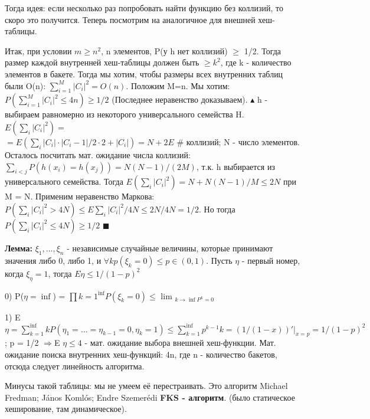 Тогда идея: если несколько раз попробовать найти функцию без коллизий, то скоро это получится. Теперь посмотрим на аналогичное для внешней хеш-таблицы. \par
Итак, при условии $m \geqslant n^2$, n элементов, P(у h нет коллизий) $\geqslant$ 1/2. Тогда размер каждой внутренней хеш-таблицы должен быть $\geqslant k^2$, где k - количество элементов в бакете. Тогда мы хотим, чтобы размеры всех внутренних таблиц были {O}(n): $\sum_{i=1}^M |C_i|^2 = {O}(n)$. Положим M=n. Мы хотим: $P(\sum_{i=1}^M |C_i|^2 \leqslant 4n) \geqslant 1/2$ (Последнее неравенство доказываем). 
$\blacktriangle$
h - выбираем равномерно из некоторого универсального семейства H. $E(\sum_i |C_i|^2) = $ \\
$= E(\sum_i |C_i|\cdot |C_i -1| /2 \cdot 2 + |C_i|) = N + 2E$ \# коллизий; N - число элементов. Осталось посчитать мат. ожидание числа коллизий: $\sum_{i < j} P(h(x_i) = h(x_j)) = N(N-1)/(2M)$, т.к. h выбирается из универсального семейства. Тогда $E(\sum_i |C_i|^2) = N + N(N-1)/M \leqslant 2N$ при M = N. Применим неравенство Маркова: $P(\sum_i |C_i|^2 > 4N) \leqslant E \sum_i |C_i|^2 /4N \leqslant 2N/4N = 1/2$. Но тогда $P(\sum_i |C_i|^2 \leqslant 4N) \geqslant 1/2$
$\blacksquare$ \par
\textbf{Лемма:} $\xi_1, \dots, \xi_n$ - независимые случайные величины, которые принимают значения либо 0, либо 1, и $\forall k p(\xi_k = 0) \leqslant p \in (0, 1)$. Пусть $\eta$ - первый номер, когда $\xi_{\eta} = 1$, тогда $E \eta \leqslant 1/(1-p)^2$ \par
0) P($\eta = \inf$) = $\prod{k=1}^{\inf} P(\xi_k = 0) \leqslant$ lim $_{k \rightarrow \inf P^k = 0}$ \par
1) E $\eta = \sum_{k=1}^{\inf} k P(\eta_1 = \dots = \eta_{k-1} = 0, \eta_k = 1) \leqslant \sum_{k=1}^{\inf} p^{k-1}k = (1/(1-x))'|_{x=p} = 1/(1-p)^2$; p = 1/2 $\Rightarrow $E $\eta \leqslant 4$ - мат. ожидание выбора внешней хеш-функции.
Мат. ожидание поиска внутренних хеш-функций: 4n, где n - количество бакетов, отсюда следует линейность алгоритма. \par
Минусы такой таблицы: мы не умеем её перестраивать. Это алгоритм Michael Fredman; János Komlós; Endre Szemerédi \textbf{FKS - алгоритм}. (было статическое хеширование, там динамическое).
\setcounter{section}{80}
